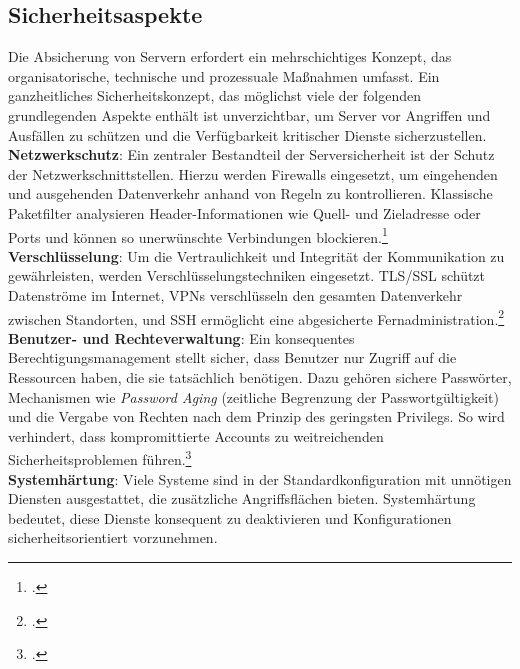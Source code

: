 \documentclass[12pt,a4paper]{report}
\begin{document}
  \subsection{Sicherheitsaspekte}
  Die Absicherung von Servern erfordert ein mehrschichtiges Konzept, 
  das organisatorische, technische und prozessuale Maßnahmen umfasst.
  Ein ganzheitliches Sicherheitskonzept, das möglichst viele der folgenden grundlegenden Aspekte enthält ist unverzichtbar, 
  um Server vor Angriffen und Ausfällen zu schützen und die Verfügbarkeit kritischer Dienste sicherzustellen.
  \\
  \newline
  \textbf{Netzwerkschutz}:  
  Ein zentraler Bestandteil der Serversicherheit ist der Schutz der Netzwerkschnittstellen. 
  Hierzu werden Firewalls eingesetzt, um eingehenden und ausgehenden Datenverkehr anhand von Regeln zu kontrollieren. 
  Klassische Paketfilter analysieren Header-Informationen wie Quell- und Zieladresse oder Ports und können so unerwünschte Verbindungen blockieren.\footcite[Vgl.][S.~932~ff.]{nemeth_unixlinux}  
  \\
  \newline
  \textbf{Verschlüsselung}:  
  Um die Vertraulichkeit und Integrität der Kommunikation zu gewährleisten, werden Verschlüsselungstechniken eingesetzt. 
  \ac{TLS}/\ac{SSL} schützt Datenströme im Internet, \acp{VPN} verschlüsseln den gesamten Datenverkehr zwischen Standorten, 
  und \ac{SSH} ermöglicht eine abgesicherte Fernadministration.\footcite[Vgl.][S.~801, S.~971, S.~926~ff., S.~942]{nemeth_unixlinux}  
  \\
  \newline
  \textbf{Benutzer- und Rechteverwaltung}:  
  Ein konsequentes Berechtigungsmanagement stellt sicher, dass Benutzer nur Zugriff auf die Ressourcen haben, die sie tatsächlich benötigen. 
  Dazu gehören sichere Passwörter, Mechanismen wie \emph{Password Aging} (zeitliche Begrenzung der Passwortgültigkeit) 
  und die Vergabe von Rechten nach dem Prinzip des geringsten Privilegs. 
  So wird verhindert, dass kompromittierte Accounts zu weitreichenden Sicherheitsproblemen führen.\footcite[Vgl.][S.~905~ff.]{nemeth_unixlinux}  
  \\
  \newline
  \textbf{Systemhärtung}:  
  Viele Systeme sind in der Standardkonfiguration mit unnötigen Diensten ausgestattet, die zusätzliche Angriffsflächen bieten. 
  Systemhärtung bedeutet, diese Dienste konsequent zu deaktivieren und Konfigurationen sicherheitsorientiert vorzunehmen. 
\end{document}
